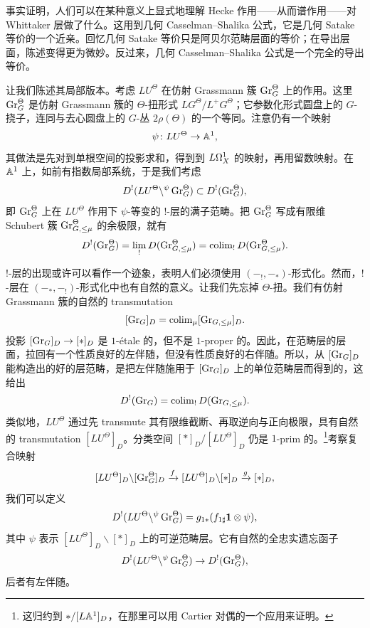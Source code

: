 事实证明，人们可以在某种意义上显式地理解 Hecke 作用——从而谱作用——对 Whittaker 层做了什么。这用到几何 Casselman--Shalika 公式，它是几何 Satake 等价的一个近亲。回忆几何 Satake 等价只是阿贝尔范畴层面的等价；在导出层面，陈述变得更为微妙。反过来，几何 Casselman--Shalika 公式是一个完全的导出等价。

让我们陈述其局部版本。考虑 $LU^{\Theta}$ 在仿射 Grassmann 簇 $\operatorname{Gr}^{\Theta}_{G}$ 上的作用。这里 $\operatorname{Gr}^{\Theta}_{G}$ 是仿射 Grassmann 簇的 $\Theta$-扭形式 $LG^{\Theta}/L^{+}G^{\Theta}$；它参数化形式圆盘上的 $G$-挠子，连同与去心圆盘上的 $G$-丛 $2\rho(\Theta)$ 的一个等同。注意仍有一个映射
\[
\psi\colon LU^{\Theta}\to\mathbb{A}^{1},
\]
其做法是先对到单根空间的投影求和，得到到 $L\Omega^{1}_{X}$ 的映射，再用留数映射。在 $\mathbb{A}^{1}$ 上，如前有指数局部系统，于是我们考虑
\[
D^{!}(LU^{\Theta}\backslash{}^{\psi}\operatorname{Gr}^{\Theta}_{G})\subset D^{!}(\operatorname{Gr}^{\Theta}_{G}),
\]
即 $\operatorname{Gr}^{\Theta}_{G}$ 上在 $LU^{\Theta}$ 作用下 $\psi$-等变的 $!$-层的满子范畴。把 $\operatorname{Gr}^{\Theta}_{G}$ 写成有限维 Schubert 簇 $\operatorname{Gr}^{\Theta}_{G,\le\mu}$ 的余极限，就有
\[
D^{!}(\operatorname{Gr}^{\Theta}_{G})=\lim_{!}D(\operatorname{Gr}^{\Theta}_{G,\le\mu})=\operatorname{colim}_{!}D(\operatorname{Gr}^{\Theta}_{G,\le\mu}).
\]

\begin{remark}
$!$-层的出现或许可以看作一个迹象，表明人们必须使用 $(-_{!},-_{*})$-形式化。然而，$!$-层在 $(-_{*},-_{!})$-形式化中也有自然的意义。让我们先忘掉 $\Theta$-扭。我们有仿射 Grassmann 簇的自然的 transmutation
\[
[\operatorname{Gr}_{G}]_{D}=\operatorname{colim}_{\mu}[\operatorname{Gr}_{G,\le\mu}]_{D}.
\]
投影 $[\operatorname{Gr}_{G}]_{D}\to[*]_{D}$ 是 $1$-étale 的，但不是 $1$-proper 的。因此，在范畴层的层面，拉回有一个性质良好的左伴随，但没有性质良好的右伴随。所以，从 $[\operatorname{Gr}_{G}]_{D}$ 能构造出的好的层范畴，是把左伴随施用于 $[\operatorname{Gr}_{G}]_{D}$ 上的单位范畴层而得到的，这给出
\[
D^{!}(\operatorname{Gr}_{G})=\operatorname{colim}_{!}D(\operatorname{Gr}_{G,\le\mu}).
\]
类似地，$LU^{\Theta}$ 通过先 transmute 其有限维截断、再取逆向与正向极限，具有自然的 transmutation $[LU^{\Theta}]_{D}$。分类空间 $[*]_{D}/[LU^{\Theta}]_{D}$ 仍是 $1$-prim 的。\footnote{这归约到 $*/[L\mathbb{A}^{1}]_{D}$，在那里可以用 Cartier 对偶的一个应用来证明。}考察复合映射
\[
[LU^{\Theta}]_{D}\backslash[\operatorname{Gr}^{\Theta}_{G}]_{D}\xrightarrow{f}[LU^{\Theta}]_{D}\backslash[*]_{D}\xrightarrow{g}[*]_{D},
\]
我们可以定义
\[
D^{!}(LU^{\Theta}\backslash{}^{\psi}\operatorname{Gr}^{\Theta}_{G})=g_{1*}(f_{1\sharp}\mathbf{1}\otimes\psi),
\]
其中 $\psi$ 表示 $[LU^{\Theta}]_{D}\backslash[*]_{D}$ 上的可逆范畴层。它有自然的全忠实遗忘函子
\[
D^{!}(LU^{\Theta}\backslash{}^{\psi}\operatorname{Gr}^{\Theta}_{G})\to D^{!}(\operatorname{Gr}^{\Theta}_{G}),
\]
后者有左伴随。
\end{remark}

